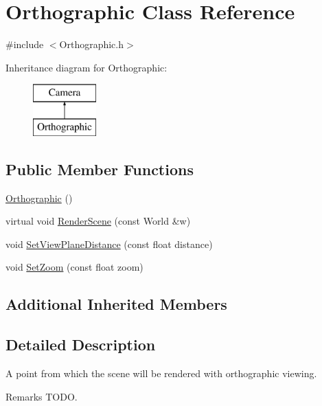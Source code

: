 \hypertarget{class_orthographic}{}\section{Orthographic Class Reference}
\label{class_orthographic}


{\ttfamily \#include $<$Orthographic.\+h$>$}

Inheritance diagram for Orthographic\+:\begin{figure}[H]
\begin{center}
\leavevmode
\includegraphics[height=2.000000cm]{class_orthographic}
\end{center}
\end{figure}
\subsection*{Public Member Functions}
\begin{DoxyCompactItemize}
\item 
\hyperlink{class_orthographic_a3b6a0b737a8f9d8b3c1961241aef04dc}{Orthographic} ()
\item 
virtual void \hyperlink{class_orthographic_a0d7ee7bfe619febed73725b99d2cc0b0}{Render\+Scene} (const World \&w)
\item 
void \hyperlink{group___cameras_ga4ad79de10c562075c049f2e580f48f9f}{Set\+View\+Plane\+Distance} (const float distance)
\item 
void \hyperlink{group___cameras_ga9a63b65c5228dc43caae0b986ea8d220}{Set\+Zoom} (const float zoom)
\end{DoxyCompactItemize}
\subsection*{Additional Inherited Members}


\subsection{Detailed Description}
A point from which the scene will be rendered with orthographic viewing. \begin{DoxyRemark}{Remarks}
T\+O\+DO. 
\end{DoxyRemark}


